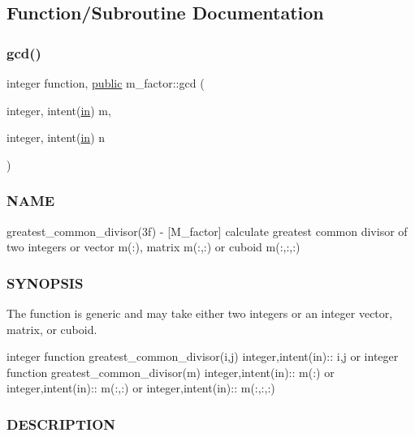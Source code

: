 \subsection{Function/\+Subroutine Documentation}
\mbox{\label{namespacem__factor_a69e8c33eff58fc447cfb8d4f3d4fae77}} 
\subsubsection{\texorpdfstring{gcd()}{gcd()}}
{\footnotesize\ttfamily integer function, \hyperlink{M__stopwatch_83_8txt_a2f74811300c361e53b430611a7d1769f}{public} m\+\_\+factor\+::gcd (\begin{DoxyParamCaption}\item[{integer, intent(\hyperlink{M__journal_83_8txt_afce72651d1eed785a2132bee863b2f38}{in})}]{m,  }\item[{integer, intent(\hyperlink{M__journal_83_8txt_afce72651d1eed785a2132bee863b2f38}{in})}]{n }\end{DoxyParamCaption})}



\subsubsection*{N\+A\+ME}

greatest\+\_\+common\+\_\+divisor(3f) -\/ \mbox{[}M\+\_\+factor\mbox{]} calculate greatest common divisor of two integers or vector m(\+:), matrix m(\+:,\+:) or cuboid m(\+:,\+:,\+:) 

\subsubsection*{S\+Y\+N\+O\+P\+S\+IS}

The function is generic and may take either two integers or an integer vector, matrix, or cuboid.

integer function greatest\+\_\+common\+\_\+divisor(i,j) integer,intent(in)\+:\+: i,j or integer function greatest\+\_\+common\+\_\+divisor(m) integer,intent(in)\+:\+: m(\+:) or integer,intent(in)\+:\+: m(\+:,\+:) or integer,intent(in)\+:\+: m(\+:,\+:,\+:)

\subsubsection*{D\+E\+S\+C\+R\+I\+P\+T\+I\+ON}

